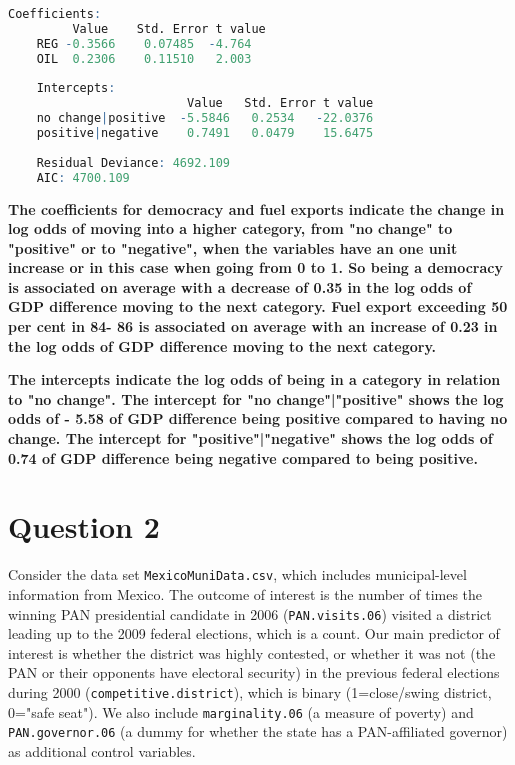 \documentclass[12pt,letterpaper]{article}
\begin{document}
\begin{enumerate}
\begin{lstlisting}[language=R]
	Coefficients:     
	     Value    Std. Error t value           
	REG -0.3566    0.07485  -4.764
	OIL  0.2306    0.11510   2.003
	
	Intercepts:                   
	                     Value   Std. Error t value 
	no change|positive  -5.5846   0.2534   -22.0376
	positive|negative    0.7491   0.0479    15.6475
	
	Residual Deviance: 4692.109 
	AIC: 4700.109 
\end{lstlisting}
\textbf{The coefficients for democracy and fuel exports indicate the change in log odds of moving into a higher category, from "no change" to "positive" or to "negative", when the variables have an one unit increase or in this case when going from 0 to 1. So being a democracy is associated on average with a decrease of 0.35 in the log odds of GDP difference moving to the next category. Fuel export exceeding 50 per cent in 84- 86 is associated on average with an increase of 0.23 in the log odds of GDP difference moving to the next category.}
 
\textbf{The intercepts indicate the log odds of being in a category in relation to "no change". The intercept for "no change"|"positive" shows the log odds of - 5.58 of GDP difference being positive compared to having no change. The intercept for "positive"|"negative" shows the log odds of 0.74 of GDP difference being negative compared to being positive.}	
\end{enumerate}

\section*{Question 2} 
\vspace{.25cm}

\noindent Consider the data set \texttt{MexicoMuniData.csv}, which includes municipal-level information from Mexico. The outcome of interest is the number of times the winning PAN presidential candidate in 2006 (\texttt{PAN.visits.06}) visited a district leading up to the 2009 federal elections, which is a count. Our main predictor of interest is whether the district was highly contested, or whether it was not (the PAN or their opponents have electoral security) in the previous federal elections during 2000 (\texttt{competitive.district}), which is binary (1=close/swing district, 0="safe seat"). We also include \texttt{marginality.06} (a measure of poverty) and \texttt{PAN.governor.06} (a dummy for whether the state has a PAN-affiliated governor) as additional control variables. 
\end{document}
